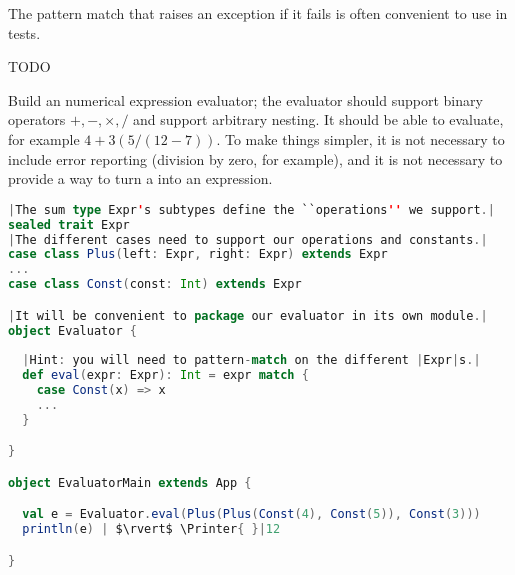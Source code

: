\documentclass[10 pt]{article}
\begin{document}
The pattern match that raises an exception if it fails is often convenient to use in tests. 

TODO

\begin{example}
Build an numerical expression evaluator; the evaluator should support binary operators $+, -, \times, /$ and support arbitrary nesting. It should be able to evaluate, for example $4+3(5/(12-7))$. To make things simpler, it is not necessary to include error reporting (division by zero, for example), and it is not necessary to provide a way to turn a  into an expression.

\begin{lstlisting}[caption={Expression evaluator}, label={code:ee}, language=Scala, escapechar=|]
|The sum type Expr's subtypes define the ``operations'' we support.|
sealed trait Expr
|The different cases need to support our operations and constants.|
case class Plus(left: Expr, right: Expr) extends Expr
...
case class Const(const: Int) extends Expr

|It will be convenient to package our evaluator in its own module.|
object Evaluator {
  
  |Hint: you will need to pattern-match on the different |Expr|s.|
  def eval(expr: Expr): Int = expr match {
    case Const(x) => x
    ...
  }

}

object EvaluatorMain extends App {

  val e = Evaluator.eval(Plus(Plus(Const(4), Const(5)), Const(3)))
  println(e) | $\rvert$ \Printer{ }|12

}
\end{lstlisting}
\end{example}
\end{document}
